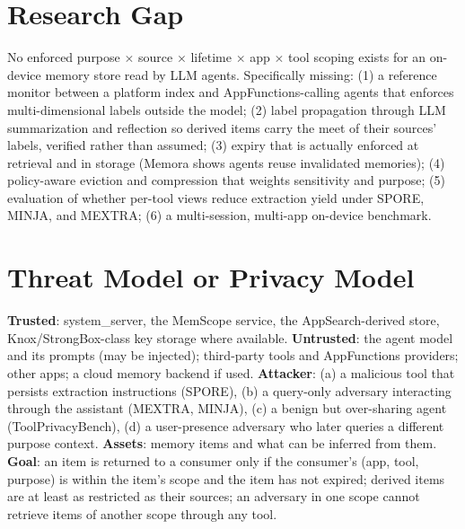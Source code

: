 \documentclass[11pt]{article}
\begin{document}
\section{Research Gap}
No enforced purpose $\times$ source $\times$ lifetime $\times$ app $\times$ tool scoping exists for an on-device memory store read by LLM agents. Specifically missing: (1) a reference monitor between a platform index and AppFunctions-calling agents that enforces multi-dimensional labels outside the model; (2) label propagation through LLM summarization and reflection so derived items carry the meet of their sources' labels, verified rather than assumed; (3) expiry that is actually enforced at retrieval and in storage (Memora shows agents reuse invalidated memories); (4) policy-aware eviction and compression that weights sensitivity and purpose; (5) evaluation of whether per-tool views reduce extraction yield under SPORE, MINJA, and MEXTRA; (6) a multi-session, multi-app on-device benchmark.

\section{Threat Model or Privacy Model}
\textbf{Trusted}: system\_server, the MemScope service, the AppSearch-derived store, Knox/StrongBox-class key storage where available. \textbf{Untrusted}: the agent model and its prompts (may be injected); third-party tools and AppFunctions providers; other apps; a cloud memory backend if used. \textbf{Attacker}: (a) a malicious tool that persists extraction instructions (SPORE), (b) a query-only adversary interacting through the assistant (MEXTRA, MINJA), (c) a benign but over-sharing agent (ToolPrivacyBench), (d) a user-presence adversary who later queries a different purpose context. \textbf{Assets}: memory items and what can be inferred from them. \textbf{Goal}: an item is returned to a consumer only if the consumer's (app, tool, purpose) is within the item's scope and the item has not expired; derived items are at least as restricted as their sources; an adversary in one scope cannot retrieve items of another scope through any tool.
\end{document}

